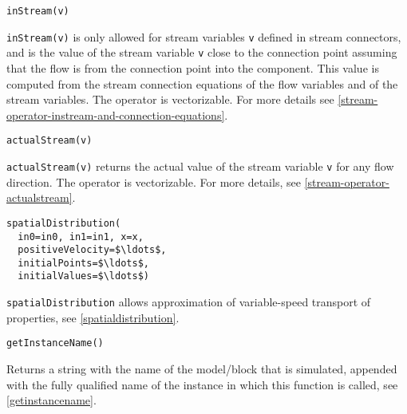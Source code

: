 \begin{operatordefinition}[inStream]
\begin{synopsis}\begin{lstlisting}
inStream(v)
\end{lstlisting}\end{synopsis}
\begin{semantics}
\lstinline!inStream(v)! is only allowed for stream variables \lstinline!v! defined in stream connectors, and is the value of the stream variable \lstinline!v! close to the connection point assuming that the flow is from the connection point into the component.  This value is computed from the stream connection equations of the flow variables and of the stream variables.  The operator is vectorizable.  For more details see \cref{stream-operator-instream-and-connection-equations}.
\end{semantics}
\end{operatordefinition}

\begin{operatordefinition}[actualStream]
\begin{synopsis}\begin{lstlisting}
actualStream(v)
\end{lstlisting}\end{synopsis}
\begin{semantics}
\lstinline!actualStream(v)! returns the actual value of the stream variable \lstinline!v! for any flow direction.  The operator is vectorizable.  For more details, see \cref{stream-operator-actualstream}.
\end{semantics}
\end{operatordefinition}

\begin{operatordefinition}[spatialDistribution]
\begin{synopsis}\begin{lstlisting}
spatialDistribution(
  in0=in0, in1=in1, x=x,
  positiveVelocity=$\ldots$,
  initialPoints=$\ldots$,
  initialValues=$\ldots$)
\end{lstlisting}\end{synopsis}
\begin{semantics}
\lstinline!spatialDistribution! allows approximation of variable-speed transport of properties, see \cref{spatialdistribution}.
\end{semantics}
\end{operatordefinition}

\begin{operatordefinition}[getInstanceName]
\begin{synopsis}\begin{lstlisting}
getInstanceName()
\end{lstlisting}\end{synopsis}
\begin{semantics}
Returns a string with the name of the model/block that is simulated, appended with the fully qualified name of the instance in which this function is called, see \cref{getinstancename}.
\end{semantics}
\end{operatordefinition}

